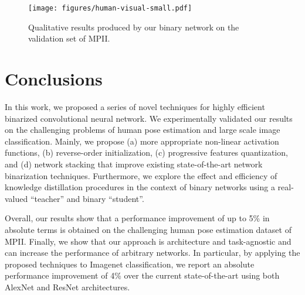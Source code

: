 \documentclass[10pt,twocolumn,letterpaper]{article}
\begin{document}
\begin{figure}[!h]
    \centering
    \texttt{[image: figures/human-visual-small.pdf]}
    \caption{Qualitative results produced by our binary network on the validation set of MPII.}
    \label{fig:examples-human}
\end{figure}


\section{Conclusions}

In this work, we proposed a series of novel techniques for highly efficient binarized convolutional neural network. We experimentally validated our results on the challenging problems of human pose estimation and large scale image classification. Mainly, we propose (a) more appropriate non-linear activation functions, (b) reverse-order initialization, (c) progressive features quantization, and (d) network stacking that improve existing state-of-the-art network binarization techniques. Furthermore, we explore the effect and efficiency of knowledge distillation procedures in the context of binary networks using a real-valued ``teacher'' and binary ``student''.

Overall, our results show that a performance improvement of up to 5\% in absolute terms is obtained on the challenging human pose estimation dataset of MPII. Finally, we show that our approach is architecture and task-agnostic and can increase the performance of arbitrary networks. In particular, by applying the proposed techniques to Imagenet classification, we report an absolute performance improvement of 4\% over the current state-of-the-art using both AlexNet and ResNet architectures. 






    
\end{document}
